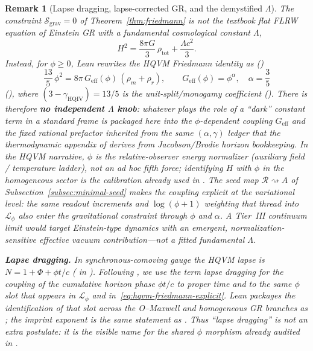 \documentclass[11pt]{amsart}
\newtheorem{remark}[theorem]{Remark}
\begin{document}
\begin{remark}[\texorpdfstring{Lapse dragging, lapse-corrected GR, and the demystified $\Lambda$}{Lapse dragging, lapse-corrected GR, and demystified Lambda}]
\label{rem:lapse-lambda}
The constraint \(\mathcal{S}_{\mathrm{grav}}=0\) of Theorem~\ref{thm:friedmann} is \emph{not} the textbook flat FLRW equation of Einstein GR with a fundamental cosmological constant \(\Lambda\),
\[
H^2=\frac{8\pi G}{3}\,\rho_{\mathrm{tot}}+\frac{\Lambda c^2}{3}.
\]
Instead, for \(\phi\ge 0\), Lean rewrites the HQVM Friedmann identity as ()
\begin{equation}
\label{eq:hqvm-friedmann-explicit}
\frac{13}{5}\,\phi^2 = 8\pi\,G_{\mathrm{eff}}(\phi)\,(\rho_m+\rho_r),
\qquad G_{\mathrm{eff}}(\phi)=\phi^{\alpha},\quad \alpha=\frac35
\end{equation}
(), where \((3-\gamma_{\mathrm{HQIV}})=13/5\) is the unit-split/monogamy coefficient (). There is therefore \textbf{no independent \(\Lambda\) knob}: whatever plays the role of a ``dark'' constant term in a standard frame is packaged here into the \(\phi\)-dependent coupling \(G_{\mathrm{eff}}\) and the fixed rational prefactor inherited from the same \((\alpha,\gamma)\) ledger that the thermodynamic appendix of \cite{hqiv-3d-growth-paper} derives from Jacobson/Brodie horizon bookkeeping. In the HQVM narrative, \(\phi\) is the relative-observer energy normalizer (auxiliary field / temperature ladder), not an ad hoc fifth force; identifying \(H\) with \(\phi\) in the homogeneous sector is the calibration already used in . The seed map \(\mathcal{R}\rightsquigarrow A\) of Subsection~\ref{subsec:minimal-seed} makes the coupling explicit at the variational level: the same readout increments and \(\log(\phi+1)\) weighting that thread into \(\mathcal{L}_\phi\) also enter the gravitational constraint through \(\phi\) and \(\alpha\). A Tier~III continuum limit would target Einstein-type dynamics with an \emph{emergent}, normalization-sensitive effective vacuum contribution---not a fitted fundamental \(\Lambda\).

\medskip
\noindent\textbf{Lapse dragging.}
In synchronous-comoving gauge the HQVM lapse is \(N=1+\Phi+\phi t/c\) ( in ). Following \cite{jacobson1995,brodie2026}, we use the term \emph{lapse dragging} for the coupling of the cumulative horizon phase \(\phi t/c\) to proper time \emph{and} to the same \(\phi\) slot that appears in \(\mathcal{L}_\phi\) and in~\eqref{eq:hqvm-friedmann-explicit}. Lean packages the identification of that slot across the O--Maxwell and homogeneous GR branches as ; the imprint exponent is the same statement as . Thus ``lapse dragging'' is not an extra postulate: it is the visible name for the shared \(\phi\) morphism already audited in .


\end{remark}
\end{document}
